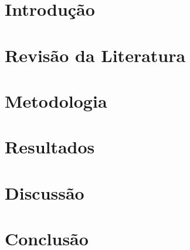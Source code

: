 \documentclass[mestrado, pos-defesa]{packages/icmc}
\begin{document}
\textual

\chapter{Introdução}
\label{chapter:introducao}


\chapter{Revisão da Literatura}
\label{chapter:rev_literatura}


\chapter{Metodologia}
\label{chapter:metodologia}


\chapter{Resultados}
\label{chapter:resultados}


\chapter{Discussão}
\label{chapter:discussao}


\chapter{Conclusão}
\label{chapter:conclusao}



% 

\postextual



\end{document}
